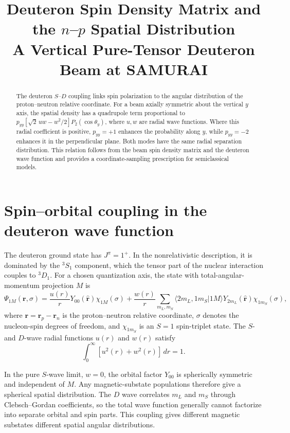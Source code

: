 \documentclass[11pt,a4paper]{article}
\title{\textbf{Deuteron Spin Density Matrix and the $n$--$p$ Spatial Distribution}\\
\large A Vertical Pure-Tensor Deuteron Beam at SAMURAI}
\author{}
\date{}
\begin{document}
\maketitle

\begin{abstract}
The deuteron $S$--$D$ coupling links spin polarization to the angular
distribution of the proton--neutron relative coordinate.
For a beam axially symmetric about the vertical $y$ axis, the spatial
density has a quadrupole term proportional to
$p_{yy}[\sqrt2\,uw-w^2/2]P_2(\cos\theta_y)$, where $u,w$ are radial wave functions.
Where this radial coefficient is positive, $p_{yy}=+1$ enhances the
probability along $y$, while $p_{yy}=-2$ enhances it in the perpendicular
plane. Both modes have the same radial separation distribution.
This relation follows from the beam spin density matrix and the deuteron
wave function and provides a coordinate-sampling prescription for
semiclassical models.
\end{abstract}

\section{Spin--orbital coupling in the deuteron wave function}

The deuteron ground state has $J^\pi=1^+$.
In the nonrelativistic description, it is dominated by the ${}^3S_1$
component, which the tensor part of the nuclear interaction couples to
${}^3D_1$. For a chosen quantization axis, the state with
total-angular-momentum projection $M$ is
\begin{equation}
\Psi_{1M}(\bm r,\sigma)
=
\frac{u(r)}{r}Y_{00}(\hat{\bm r})\chi_{1M}(\sigma)
+
\frac{w(r)}{r}
\sum_{m_L,m_S}
\langle 2m_L,1m_S|1M\rangle
Y_{2m_L}(\hat{\bm r})\chi_{1m_S}(\sigma),
\label{eq:deuteronwf}
\end{equation}
where $\bm r=\bm r_p-\bm r_n$ is the proton--neutron relative coordinate,
$\sigma$ denotes the nucleon-spin degrees of freedom, and $\chi_{1m_S}$
is an $S=1$ spin-triplet state. The $S$- and $D$-wave radial functions
$u(r)$ and $w(r)$ satisfy
\[
\int_0^\infty [u^2(r)+w^2(r)]\,dr=1.
\]

In the pure $S$-wave limit, $w=0$, the orbital factor $Y_{00}$ is
spherically symmetric and independent of $M$. Any magnetic-substate
populations therefore give a spherical spatial distribution.
The $D$ wave correlates $m_L$ and $m_S$ through Clebsch--Gordan
coefficients, so the total wave function generally cannot factorize
into separate orbital and spin parts. This coupling gives different
magnetic substates different spatial angular distributions.
\end{document}
